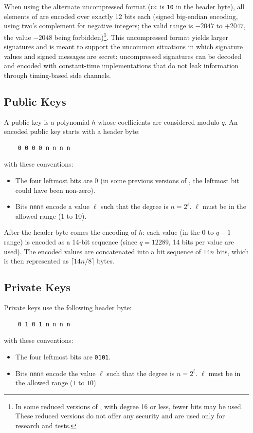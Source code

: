 When using the alternate uncompressed format (\texttt{cc} is \texttt{10}
in the header byte), all elements of \comps are encoded over exactly 12
bits each (signed big-endian encoding, using two's complement for
negative integers; the valid range is $-2047$ to $+2047$, the value
$-2048$ being forbidden)\footnote{In some reduced versions of \falcon,
with degree 16 or less, fewer bits may be used. These reduced versions
do not offer any security and are used only for research and tests.}.
This uncompressed format yields larger signatures and is meant to
support the uncommon situations in which signature values and signed
messages are secret: uncompressed signatures can be decoded and encoded
with constant-time implementations that do not leak information through
timing-based side channels.

\subsection{Public Keys}

A \falcon public key is a polynomial $h$ whose coefficients are considered
modulo $q$. An encoded public key starts with a header byte:
\begin{verbatim}
    0 0 0 0 n n n n
\end{verbatim}
with these conventions:
\begin{itemize}
\item The four leftmost bits are 0 (in some previous versions of \falcon,
the leftmost bit could have been non-zero).
\item Bits \texttt{nnnn} encode a value $\ell$ such that the degree is
$n = 2^\ell$. $\ell$ must be in the allowed range ($1$ to $10$).
\end{itemize}

After the header byte comes the encoding of $h$: each value (in the $0$
to $q-1$ range) is encoded as a 14-bit sequence (since $q = 12289$, 14 bits
per value are used). The encoded values are concatenated
into a bit sequence of $14n$ bits, which is then represented as
$\lceil 14n/8\rceil$ bytes.

\subsection{Private Keys}

Private keys use the following header byte:
\begin{verbatim}
    0 1 0 1 n n n n
\end{verbatim}
with these conventions:
\begin{itemize}
\item The four leftmost bits are \texttt{0101}.
\item Bits \texttt{nnnn} encode the value $\ell$ such that the degree
is $n = 2^\ell$. $\ell$ must be in the allowed range ($1$ to $10$).
\end{itemize}

